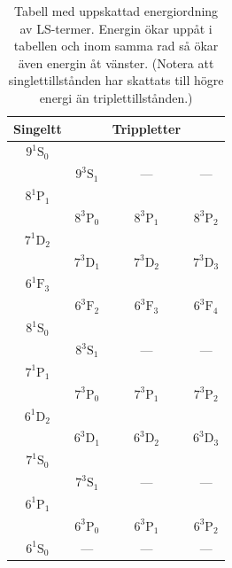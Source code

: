 \documentclass[11pt,a4paper]{article}
\begin{document}
\begin{table}
\centering
\caption{Tabell med uppskattad energiordning av LS-termer. Energin ökar uppåt i tabellen och inom samma rad så ökar även energin åt vänster. (Notera att singlettillstånden har skattats till högre energi än triplettillstånden.)} 
\label{tab:sorterade_termer}
\begin{tabular}{|c|ccc|}\hline
Singeltt & & Trippletter &\\\hline\hline
 $9^1\mathrm{S}_0$ & & &\\
&$9^3\mathrm{S}_1$ & --- &--- 
\\ \hline
 $8^1\mathrm{P}_1$ & & &\\
&$8^3\mathrm{P}_0$ & $8^3\mathrm{P}_1$ & $8^3\mathrm{P}_2$ 
\\ \hline
 $7^1\mathrm{D}_2$ & & &\\
&$7^3\mathrm{D}_1$ & $7^3\mathrm{D}_2$ & $7^3\mathrm{D}_3$ 
\\ \hline
 $6^1\mathrm{F}_3$ & & &\\
&$6^3\mathrm{F}_2$ & $6^3\mathrm{F}_3$ & $6^3\mathrm{F}_4$ 
\\ \hline
 $8^1\mathrm{S}_0$ & & &\\
&$8^3\mathrm{S}_1$ & --- &--- 
\\ \hline
 $7^1\mathrm{P}_1$ & & &\\
&$7^3\mathrm{P}_0$ & $7^3\mathrm{P}_1$ & $7^3\mathrm{P}_2$ 
\\ \hline
 $6^1\mathrm{D}_2$ & & &\\
&$6^3\mathrm{D}_1$ & $6^3\mathrm{D}_2$ & $6^3\mathrm{D}_3$ 
\\ \hline
 $7^1\mathrm{S}_0$ & & & \\
&$7^3\mathrm{S}_1$ &--- &--- 
\\ \hline
 $6^1\mathrm{P}_1$ & & &\\
&$6^3\mathrm{P}_0$ & $6^3\mathrm{P}_1$ & $6^3\mathrm{P}_2$ 
\\ \hline
$6^1\mathrm{S}_0$ & --- & --- & ---
\\ \hline
\end{tabular}
\end{table}
\end{document}
